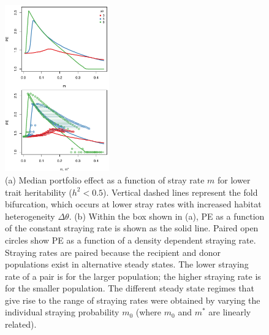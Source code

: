 \documentclass[twocolumn,preprintnumbers,amsmath,amssymb,superscriptaddress]{revtex4}
\begin{document}
\begin{figure}
  \captionsetup{justification=raggedright,
singlelinecheck=false
}
\centering
\includegraphics[width=0.4\textwidth]{figs2/fig_thetaPEmvm.pdf}
\caption{
(a) Median portfolio effect as a function of stray rate $m$ for lower trait heritability ($h^2 < 0.5$).
Vertical dashed lines represent the fold bifurcation, which occurs at lower stray rates with increased habitat heterogeneity $\Delta \theta$.
(b) Within the box shown in (a), PE as a function of the constant straying rate is shown as the solid line. Paired open circles show PE as a function of a density dependent straying rate. Straying rates are paired because the recipient and donor populations exist in alternative steady states. The lower straying rate of a pair is for the larger population; the higher straying rate is for the smaller population.
The different steady state regimes that give rise to the range of straying rates were obtained by varying the individual straying probability $m_0$ (where $m_0$ and $m^*$ are linearly related).
} \label{fig:thetaPE}
\end{figure}

\end{document}
